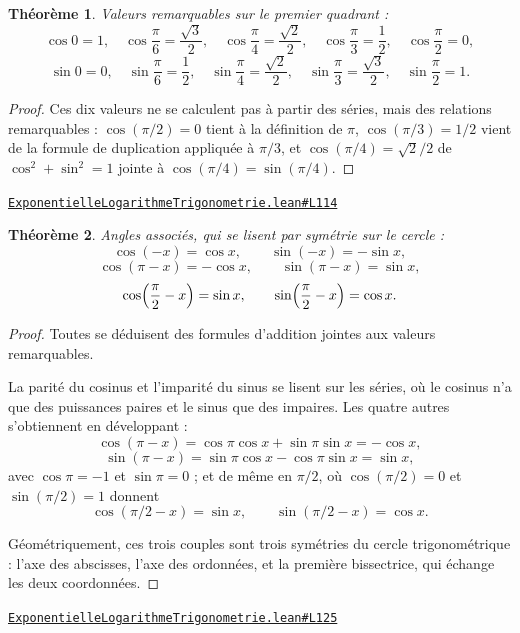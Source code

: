 \documentclass[11pt,a4paper]{article}
\theoremstyle{definition}
\theoremstyle{plain}
\newtheorem{theoreme}{Théorème}
\newcommand{\source}[2]{\par\smallskip\noindent\hfill{\footnotesize\href{#1}{\texttt{#2}}}\par\smallskip}
\begin{document}
\begin{theoreme}
Valeurs remarquables sur le premier quadrant :
\[ \cos 0 = 1, \quad \cos\frac{\pi}{6} = \frac{\sqrt{3}}{2}, \quad
   \cos\frac{\pi}{4} = \frac{\sqrt{2}}{2}, \quad \cos\frac{\pi}{3} = \frac{1}{2}, \quad
   \cos\frac{\pi}{2} = 0, \]
\[ \sin 0 = 0, \quad \sin\frac{\pi}{6} = \frac{1}{2}, \quad
   \sin\frac{\pi}{4} = \frac{\sqrt{2}}{2}, \quad \sin\frac{\pi}{3} = \frac{\sqrt{3}}{2},
   \quad \sin\frac{\pi}{2} = 1 . \]
\end{theoreme}

\begin{proof}
Ces dix valeurs ne se calculent pas à partir des séries, mais des relations remarquables : $\cos(\pi/2) = 0$ tient à la
définition de $\pi$, $\cos(\pi/3) = 1/2$ vient de la formule de duplication appliquée à
$\pi/3$, et $\cos(\pi/4) = \sqrt{2}/2$ de $\cos^{2} + \sin^{2} = 1$ jointe à
$\cos(\pi/4) = \sin(\pi/4)$.
\end{proof}
\source{https://github.com/Commutator-IO/learn-lean/blob/main/courses/02-lycee/05-exponentielle-logarithme-trigonometrie/ExponentielleLogarithmeTrigonometrie.lean\#L114}{ExponentielleLogarithmeTrigonometrie.lean\#L114}

\begin{theoreme}
Angles associés, qui se lisent par symétrie sur le cercle :
\[ \cos(-x) = \cos x, \qquad \sin(-x) = -\sin x, \]
\[ \cos(\pi - x) = -\cos x, \qquad \sin(\pi - x) = \sin x, \]
\[ \cos\Bigl(\frac{\pi}{2} - x\Bigr) = \sin x, \qquad
   \sin\Bigl(\frac{\pi}{2} - x\Bigr) = \cos x . \]
\end{theoreme}

\begin{proof}
Toutes se déduisent des formules d'addition jointes aux valeurs remarquables.

La parité du cosinus et l'imparité du sinus se lisent sur les séries, où le cosinus n'a que
des puissances paires et le sinus que des impaires. Les quatre autres s'obtiennent en
développant :
\[ \cos(\pi - x) = \cos\pi\cos x + \sin\pi\sin x = -\cos x , \]
\[ \sin(\pi - x) = \sin\pi\cos x - \cos\pi\sin x = \sin x , \]
avec $\cos\pi = -1$ et $\sin\pi = 0$ ; et de même en $\pi/2$, où $\cos(\pi/2) = 0$ et
$\sin(\pi/2) = 1$ donnent
\[ \cos(\pi/2 - x) = \sin x , \qquad \sin(\pi/2 - x) = \cos x . \]

Géométriquement, ces trois couples sont trois symétries du cercle trigonométrique :
l'axe des abscisses, l'axe des ordonnées, et la première bissectrice, qui échange les deux
coordonnées.
\end{proof}
\source{https://github.com/Commutator-IO/learn-lean/blob/main/courses/02-lycee/05-exponentielle-logarithme-trigonometrie/ExponentielleLogarithmeTrigonometrie.lean\#L125}{ExponentielleLogarithmeTrigonometrie.lean\#L125}
\end{document}
